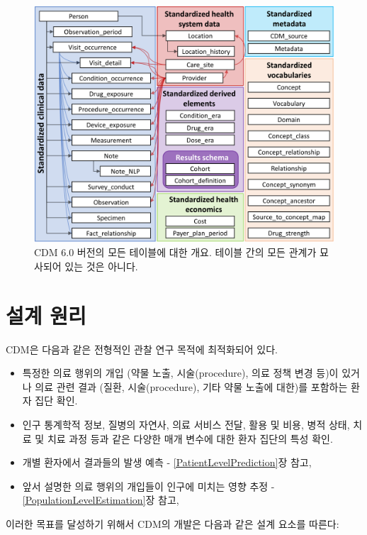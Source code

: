 \documentclass[11pt]{book}
\providecommand{\tightlist}{%
  \setlength{\itemsep}{0pt}\setlength{\parskip}{0pt}}
\theoremstyle{definition}
\theoremstyle{definition}
\theoremstyle{definition}
\theoremstyle{remark}
\begin{document}
\begin{figure}
\includegraphics[width=1\linewidth]{images/CommonDataModel/cdmDiagram} \caption{CDM 6.0 버전의 모든 테이블에 대한 개요. 테이블 간의 모든 관계가 묘사되어 있는 것은 아니다.}\label{fig:cdmDiagram}
\end{figure}

\section{설계 원리}\label{-}

CDM은 다음과 같은 전형적인 관찰 연구 목적에 최적화되어
있다.

\begin{itemize}
\tightlist
\item
  특정한 의료 행위의 개입 (약물 노출, 시술(procedure), 의료 정책 변경
  등)이 있거나 의료 관련 결과 (질환, 시술(procedure), 기타 약물 노출에
  대한)를 포함하는 환자 집단 확인.
\item
  인구 통계학적 정보, 질병의 자연사, 의료 서비스 전달, 활용 및 비용,
  병적 상태, 치료 및 치료 과정 등과 같은 다양한 매개 변수에 대한 환자
  집단의 특성 확인.
\item
  개별 환자에서 결과들의 발생 예측 - \ref{PatientLevelPrediction}장
  참고,
\item
  앞서 설명한 의료 행위의 개입들이 인구에 미치는 영향 추정 -
  \ref{PopulationLevelEstimation}장 참고,
\end{itemize}

이러한 목표를 달성하기 위해서 CDM의 개발은 다음과 같은 설계 요소를
따른다:
\end{document}

